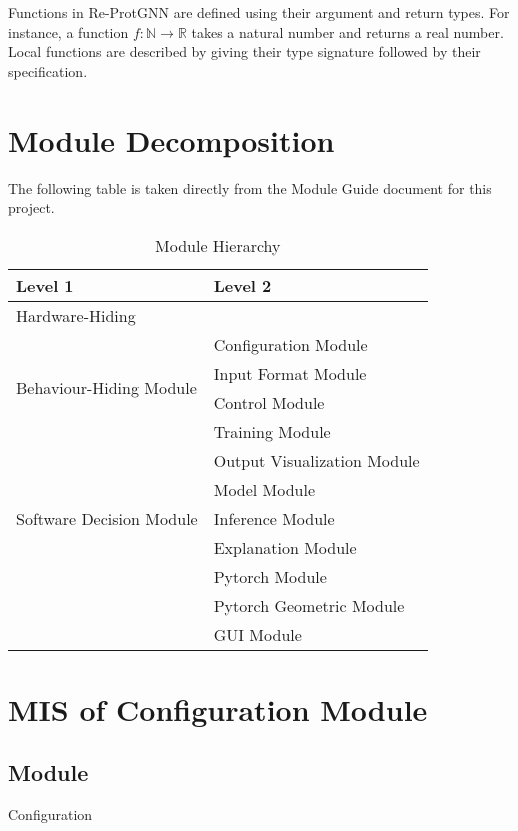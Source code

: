 \documentclass[12pt, titlepage]{article}
\begin{document}
\noindent
Functions in Re-ProtGNN are defined using their argument and return types.
For instance, a function $f: \mathbb{N} \rightarrow \mathbb{R}$ takes a natural number and returns a real number. Local functions are
described by giving their type signature followed by their specification.


\section{Module Decomposition}

The following table is taken directly from the Module Guide document for this project.

\begin{table}[h!]
\centering
\begin{tabular}{p{} p{}}
\toprule
\textbf{Level 1} & \textbf{Level 2}\\
\midrule

{Hardware-Hiding} & ~ \\
\midrule

\multirow{4}{0.3\textwidth}{Behaviour-Hiding Module} & Configuration Module \\
& Input Format Module\\
& Control Module\\
& Training Module\\
& Output Visualization Module\\
\midrule

\multirow{3}{0.3\textwidth}{Software Decision Module} & {Model Module}\\
& Inference Module\\
& Explanation Module\\
& Pytorch Module\\
& Pytorch Geometric Module\\
& GUI Module\\
\bottomrule

\end{tabular}
\caption{Module Hierarchy}
\label{TblMH}
\end{table}

\newpage


\section{MIS of Configuration Module} \label{Configurations}

\subsection{Module}
Configuration
\end{document}
